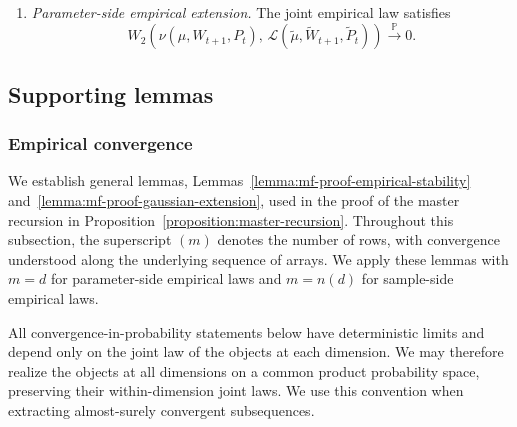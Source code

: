 \begin{proposition}
\begin{description}[wide]
\begin{enumerate}[label=(\roman*),wide]
        \item \emph{Parameter-side empirical extension.}
        The joint empirical law satisfies
        \begin{equation}
            W_2 \left( 
            \nu{(\mu,W_{t+1},P_t)} 
            , \, 
            \mathscr L(
                \tilde\mu,\tilde W_{t+1},\tilde P_t
            )
            \right)
            \xrightarrow{\mathbb P}
            0
            .
            \label{eq:master-backward-empirical-law}
        \end{equation}
    \end{enumerate}
\end{description}
\end{proposition}

\subsection{Supporting lemmas}
\label{subsec:supporting-lem}

    \subsubsection{Empirical convergence}

        We establish general lemmas,
        Lemmas~\ref{lemma:mf-proof-empirical-stability}
        and~\ref{lemma:mf-proof-gaussian-extension},
        used in the proof of the master recursion in 
        Proposition~\ref{proposition:master-recursion}.
        Throughout this subsection, the superscript $(m)$
        denotes the number of rows, with convergence understood
        along the underlying sequence of arrays.
        We apply these lemmas with $m=d$ for parameter-side
        empirical laws and $m=n(d)$ for sample-side empirical laws.

        All convergence-in-probability statements below have
        deterministic limits and depend only on the joint law of
        the objects at each dimension. We may therefore realize
        the objects at all dimensions on a common product
        probability space, preserving their within-dimension joint
        laws. We use this convention when extracting almost-surely
        convergent subsequences.

